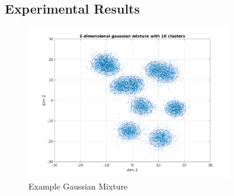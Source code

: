 \documentclass[11pt]{article}
\begin{document}
\subsection{Experimental Results}
\begin{figure}[ht]
	\begin{center}
		\includegraphics[width=0.8\textwidth]{FIGS/example_gaussian_mixture.png}
		\caption{Example Gaussian Mixture}
		\label{fig:example_gm}
	\end{center}
\end{figure}
\end{document}
